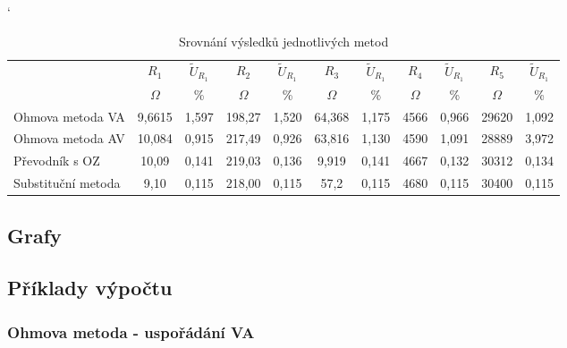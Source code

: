 \documentclass[a4paper, czech]{article}
\begin{document}
\begin{table}[H]
    \catcode`
    \centering
    \caption{Srovnání výsledků jednotlivých metod}
    \begin{tabular}{lcccccccccc}
        \toprule
        \multirow{2}{*}{}    & $R_1$     & $\tilde{U}_{R_1}$ & $R_2$      & $\tilde{U}_{R_1}$ & $R_3$     & $\tilde{U}_{R_1}$ & $R_4$       & $\tilde{U}_{R_1}$ & $R_5$    & $\tilde{U}_{R_1}$ \\
        \cmidrule(rl){2-3}
        \cmidrule(rl){4-5}
        \cmidrule(rl){6-7}
        \cmidrule(rl){8-9}
        \cmidrule(rl){10-11}
                            & $\Omega$      & \%    & $\Omega$       & \%    & $\Omega$      & \%    & $\Omega$        & \%    & $\Omega$     & \%    \\
        \midrule
        Ohmova   metoda VA   & 9,6615 & 1,597 & 198,27 & 1,520 & 64,368 & 1,175 & 4566 & 0,966 & 29620 & 1,092 \\
        Ohmova   metoda AV   & 10,084 & 0,915 & 217,49  & 0,926 & 63,816 & 1,130 & 4590   & 1,091 & 28889 & 3,972 \\
        Převodník   s OZ     & 10,09  & 0,141 & 219,03  & 0,136 & 9,919  & 0,141 & 4667     & 0,132 & 30312 & 0,134 \\
        Substituční   metoda & 9,10    & 0,115 & 218,00     & 0,115 & 57,2   & 0,115 & 4680     & 0,115 & 30400 & 0,115 \\
        \bottomrule
    \end{tabular}
\end{table}

\subsection{Grafy}

\subsection{Příklady výpočtu}

\subsubsection{Ohmova metoda - uspořádání VA}
\end{document}
